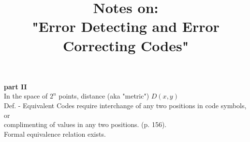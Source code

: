 \documentclass[12pt]{article}
\title{Notes on:\\"Error Detecting and Error Correcting Codes"}
\author{}
\date{} %
\begin{document}
\maketitle

\textbf{part II}\\
In the space of $2^n$ points, distance (aka "metric") $D(x,y)$\\
Def. - Equivalent Codes require interchange of any two positions in code symbols, or\\
complimenting of values in any two positions. (p. 156).\\
Formal equivalence relation exists.
\end{document}
